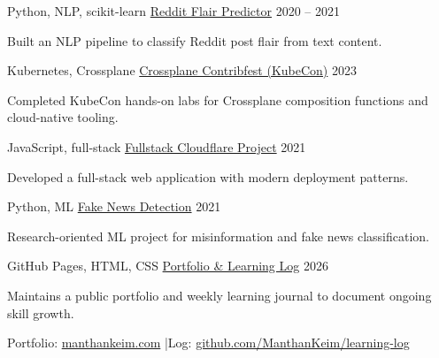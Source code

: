 

\begin{cventries}

  \cventry
    {Python, NLP, scikit-learn}
    {\href{https://github.com/ManthanKeim/Reddit-Flair-Predictor}{Reddit Flair Predictor}}
    {}
    {2020 -- 2021}
    {
      \begin{cvitems}
        \item {Built an NLP pipeline to classify Reddit post flair from text content.}
      \end{cvitems}
    }

  \cventry
    {Kubernetes, Crossplane}
    {\href{https://github.com/ManthanKeim/contribfest}{Crossplane Contribfest (KubeCon)}}
    {}
    {2023}
    {
      \begin{cvitems}
        \item {Completed KubeCon hands-on labs for Crossplane composition functions and cloud-native tooling.}
      \end{cvitems}
    }

  \cventry
    {JavaScript, full-stack}
    {\href{https://github.com/ManthanKeim/Fullstack_Task_Cloudflare}{Fullstack Cloudflare Project}}
    {}
    {2021}
    {
      \begin{cvitems}
        \item {Developed a full-stack web application with modern deployment patterns.}
      \end{cvitems}
    }

  \cventry
    {Python, ML}
    {\href{https://github.com/ManthanKeim/Fake-News-Detection}{Fake News Detection}}
    {}
    {2021}
    {
      \begin{cvitems}
        \item {Research-oriented ML project for misinformation and fake news classification.}
      \end{cvitems}
    }

  \cventry
    {GitHub Pages, HTML, CSS}
    {\href{https://manthankeim.com}{Portfolio \& Learning Log}}
    {}
    {2026}
    {
      \begin{cvitems}
        \item {Maintains a public portfolio and weekly learning journal to document ongoing skill growth.}
        \item {Portfolio: \href{https://manthankeim.com}{manthankeim.com} \quad|\quad Log: \href{https://github.com/ManthanKeim/learning-log}{github.com/ManthanKeim/learning-log}}
      \end{cvitems}
    }

\end{cventries}
